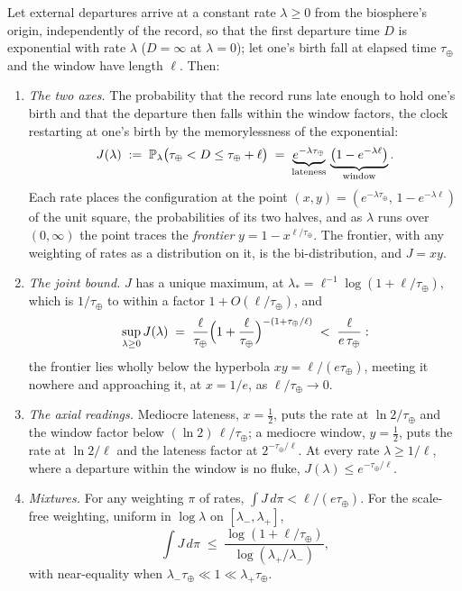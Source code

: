 \begin{proposition}\label{gc:prop:departures}
Let external departures arrive at a constant rate $\lambda\ge0$ from the
biosphere's origin, independently of the record, so that the first
departure time $D$ is exponential with rate $\lambda$ ($D=\infty$ at
$\lambda=0$); let one's birth fall at elapsed time $\tau_\oplus$ and the
window have length $\ell$. Then:
\begin{enumerate}[label=\emph{(\roman*)},itemsep=2pt]
\item \emph{The two axes.} The probability that the record runs late
enough to hold one's birth and that the departure then falls within the
window factors, the clock restarting at one's birth by the memorylessness
of the exponential:
\begin{equation}\label{gc:eq:departjoint}
J(\lambda)\;:=\;\mathbb{P}_\lambda\bigl(\tau_\oplus<D\le\tau_\oplus+\ell\bigr)
\;=\;\underbrace{e^{-\lambda\tau_\oplus}}_{\text{lateness}}\,
\underbrace{\bigl(1-e^{-\lambda\ell}\bigr)}_{\text{window}} .
\end{equation}
Each rate places the configuration at the point
$(x,y)=(e^{-\lambda\tau_\oplus},\,1-e^{-\lambda\ell})$ of the unit
square, the probabilities of its two halves, and as $\lambda$ runs over
$(0,\infty)$ the point traces the \emph{frontier}
$y=1-x^{\ell/\tau_\oplus}$. The frontier, with any weighting of rates as
a distribution on it, is the bi-distribution, and $J=xy$.
\item \emph{The joint bound.} $J$ has a unique maximum, at
$\lambda_\ast=\ell^{-1}\log(1+\ell/\tau_\oplus)$, which is
$1/\tau_\oplus$ to within a factor $1+O(\ell/\tau_\oplus)$, and
\begin{equation}\label{gc:eq:departbound}
\sup_{\lambda\ge0}J(\lambda)\;=\;\frac{\ell}{\tau_\oplus}
\Bigl(1+\frac{\ell}{\tau_\oplus}\Bigr)^{-(1+\tau_\oplus/\ell)}
\;<\;\frac{\ell}{e\,\tau_\oplus}:
\end{equation}
the frontier lies wholly below the hyperbola $xy=\ell/(e\tau_\oplus)$,
meeting it nowhere and approaching it, at $x=1/e$, as
$\ell/\tau_\oplus\to0$.
\item \emph{The axial readings.} Mediocre lateness, $x=\tfrac12$, puts
the rate at $\ln2/\tau_\oplus$ and the window factor below
$(\ln2)\,\ell/\tau_\oplus$; a mediocre window, $y=\tfrac12$, puts the
rate at $\ln2/\ell$ and the lateness factor at $2^{-\tau_\oplus/\ell}$.
At every rate $\lambda\ge1/\ell$, where a departure within the window is
no fluke, $J(\lambda)\le e^{-\tau_\oplus/\ell}$.
\item \emph{Mixtures.} For any weighting $\pi$ of rates,
$\int J\,d\pi<\ell/(e\tau_\oplus)$. For the scale-free weighting,
uniform in $\log\lambda$ on $[\lambda_-,\lambda_+]$,
\begin{equation}\label{gc:eq:departscalefree}
\int J\,d\pi\;\le\;\frac{\log(1+\ell/\tau_\oplus)}{\log(\lambda_+/\lambda_-)},
\end{equation}
with near-equality when $\lambda_-\tau_\oplus\ll1\ll\lambda_+\tau_\oplus$.
\end{enumerate}
\end{proposition}

